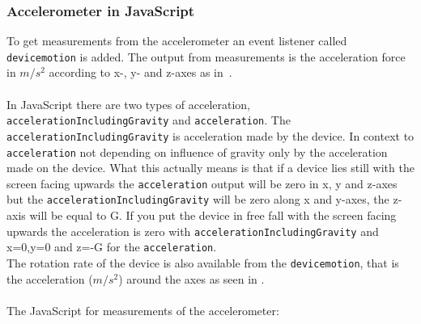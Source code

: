 \subsubsection{Accelerometer in JavaScript}\label{subsec:accJS}
To get measurements from the accelerometer an event listener called \texttt{devicemotion} is added. The output from measurements is the acceleration force in $m/s^2$ according to x-, y- and z-axes as in~. \\
\\
In JavaScript there are two types of acceleration, \texttt{accelerationIncludingGravity} and \texttt{acceleration}. The \texttt{accelerationIncludingGravity} is acceleration made by the device. In context to \texttt{acceleration} not depending on influence of gravity only by the acceleration made on the device. What this actually means is that if a device lies still with the screen facing upwards the \texttt{acceleration} output will be zero in x, y and z-axes but the \texttt{accelerationIncludingGravity} will be zero along x and y-axes, the z-axis will be equal to G. If you put the device in free fall with the screen facing upwards the acceleration is zero with \texttt{accelerationIncludingGravity} and x=0,y=0 and z=-G for the \texttt{acceleration}. \cite{sensor:W3Cspec} \\
The rotation rate of the device is also available from the \texttt{devicemotion}, that is the acceleration ($m/s^2$) around the axes as seen in . \\
\\
The JavaScript for measurements of the accelerometer:

\cite[]{sensor:W3C}



